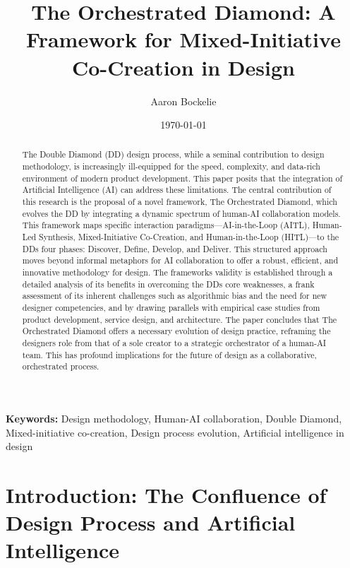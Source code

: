 \documentclass[
  12pt,
  a4paper,
  bibliography=totoc,
  numbers=noenddot
]{scrartcl}
\title{The Orchestrated Diamond: A Framework for Mixed-Initiative Co-Creation in Design}
\author{Aaron Bockelie}
\affil{Independent Researcher, Wichita, Kansas}
\date{\today}
\begin{document}
\maketitle

\begin{abstract}

The Double Diamond (DD) design process, while a seminal contribution to
design methodology, is increasingly ill-equipped for the speed,
complexity, and data-rich environment of modern product development.
This paper posits that the integration of Artificial Intelligence (AI)
can address these limitations. The central contribution of this research
is the proposal of a novel framework, The Orchestrated Diamond, which
evolves the DD by integrating a dynamic spectrum of human-AI
collaboration models. This framework maps specific interaction
paradigms---AI-in-the-Loop (AITL), Human-Led Synthesis, Mixed-Initiative
Co-Creation, and Human-in-the-Loop (HITL)---to the DD\textquotesingle s
four phases: Discover, Define, Develop, and Deliver. This structured
approach moves beyond informal metaphors for AI collaboration to offer a
robust, efficient, and innovative methodology for design. The
framework\textquotesingle s validity is established through a detailed
analysis of its benefits in overcoming the DD\textquotesingle s core
weaknesses, a frank assessment of its inherent challenges such as
algorithmic bias and the need for new designer competencies, and by
drawing parallels with empirical case studies from product development,
service design, and architecture. The paper concludes that The
Orchestrated Diamond offers a necessary evolution of design practice,
reframing the designer\textquotesingle s role from that of a sole
creator to a strategic orchestrator of a human-AI team. This has
profound implications for the future of design as a collaborative,
orchestrated process.
\end{abstract}

\textbf{Keywords:} Design methodology, Human-AI collaboration, Double Diamond, Mixed-initiative co-creation, Design process evolution, Artificial intelligence in design

\tableofcontents
\newpage

\section{Introduction: The
Confluence of Design Process and Artificial
Intelligence}\label{section-1-introduction-the-confluence-of-design-process-and-artificial-intelligence}
\end{document}

